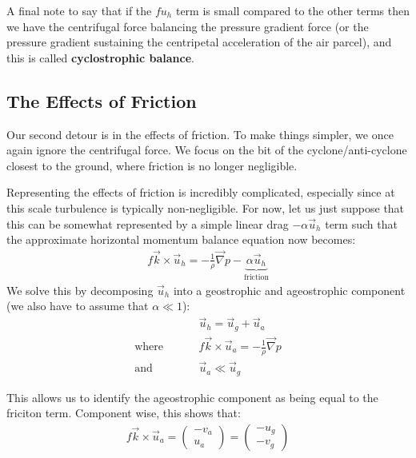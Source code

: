 A final note to say that if the \(fu_h\) term is small compared to the other terms then we have the centrifugal force balancing the pressure gradient force (or the pressure gradient sustaining the centripetal acceleration of the air parcel), and this is called \textbf{cyclostrophic balance}.

\subsection{The Effects of Friction}

Our second detour is in the effects of friction. To make things simpler, we once again ignore the centrifugal force. We focus on the bit of the cyclone/anti-cyclone closest to the ground, where friction is no longer negligible.

Representing the effects of friction is incredibly complicated, especially since at this scale turbulence is typically non-negligible. For now, let us just suppose that this can be somewhat represented by a simple linear drag $-\alpha \vec{u}_h$ term such that the approximate horizontal momentum balance equation now becomes:
\begin{align*}
    f\vec{k}\times\vec{u}_h = -\frac{1}{\rho}\vec{\nabla}p - \underbrace{\alpha\vec{u}_h}_{\text{friction}}
\end{align*}
We solve this by decomposing \(\vec{u}_h\) into a geostrophic and ageostrophic component (we also have to assume that \(\alpha \ll 1\)):
\begin{align*}
    &\vec{u}_h = \vec{u}_g + \vec{u}_a
    \\
    \text{where}\hspace{1cm}&f\vec{k}\times\vec{u}_a = -\frac{1}{\rho}\vec{\nabla}p
    \\
    \text{and}\hspace{1cm}&\vec{u}_a\ll \vec{u}_g
\end{align*}

This allows us to identify the ageostrophic component as being equal to the friciton term. Component wise, this shows that:
\begin{align*}
    f\vec{k}\times\vec{u}_a = \left( \begin{array}{c}
        -v_a
        \\
        u_a
    \end{array} \right)
    =
    \left( \begin{array}{c}
        -u_g
        \\
        -v_g
    \end{array} \right)
\end{align*}

